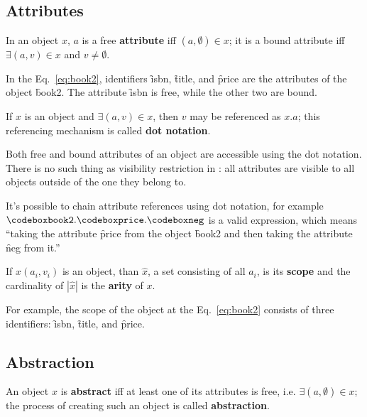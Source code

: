 \subsection{Attributes}

\begin{eodefinition}\label{def:attribute}
In an object $x$, $a$ is a free \textbf{attribute}
iff $(a, \emptyset) \in x$; it is a bound attribute
iff $\exists (a, v)\in x$ and $v\not=\emptyset$.
\end{eodefinition}

In the Eq.~\ref{eq:book2}, identifiers \f{isbn}, \f{title}, and \f{price}
are the attributes of the object \f{book2}.
The attribute \f{isbn} is free, while the other two are bound.

\begin{eodefinition}\label{def:dot}
If $x$ is an object and $\exists (a, v) \in x$, then $v$ may be referenced as $x.a$;
this referencing mechanism is called \textbf{dot notation}.
\end{eodefinition}

Both free and bound attributes of an object are accessible using
the dot notation. There is no such thing as
visibility restriction in \phic{}:
all attributes are visible to all objects outside of the one they belong to.

It's possible to chain attribute references using dot notation, for example
$\f{book2}.\f{price}.\f{neg}$ is a valid expression, which means
``taking the attribute \f{price} from the object \f{book2} and then
taking the attribute \f{neg} from it.''

\begin{eodefinition}\label{def:scope}
If $x(a_i, v_i)$ is an object, than $\hat{x}$, a set consisting of all $a_i$,
is its \textbf{scope} and the cardinality of $|\hat{x}|$ is
the \textbf{arity} of $x$.
\end{eodefinition}

For example, the scope of the object at the Eq.~\ref{eq:book2} consists of three identifiers:
\f{isbn}, \f{title}, and \f{price}.

\subsection{Abstraction}

\begin{eodefinition}\label{def:abstraction}
An object $x$ is \textbf{abstract} iff at least one of its attributes is free,
i.e. $\exists (a, \emptyset)\in x$;
the process of creating such an object is called \textbf{abstraction}.
\end{eodefinition}

